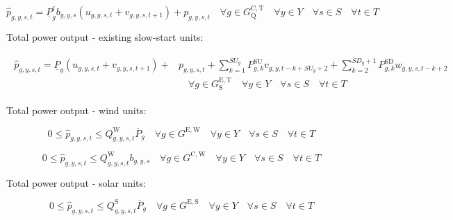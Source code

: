 \documentclass{article}
\newcommand{\sGeneratorsExistingWind}{G^{\mathrm{E,W}}}
\newcommand{\sGeneratorsExistingSolar}{G^{\mathrm{E,S}}}
\newcommand{\sGeneratorsCandidateWind}{G^{\mathrm{C,W}}}
\newcommand{\sYears}{Y}
\newcommand{\sScenarios}{S}
\newcommand{\sIntervals}{T}
\newcommand{\sGeneratorsCandidateThermalQuickStart}{G^{\mathrm{C,T}}_\mathrm{Q}}
\newcommand{\sGeneratorsExistingThermalSlowStart}{G^{\mathrm{E,T}}_\mathrm{S}}
\newcommand{\iGenerator}{g}
\newcommand{\iYear}{y}
\newcommand{\iScenario}{s}
\newcommand{\iInterval}{t}
\newcommand{\iIntervalAlias}{k}
\newcommand{\cPowerOutputMax}[1][\iGenerator,\iYear]{\overline{P}_{#1}}
\newcommand{\cPowerOutputMin}[1][\iGenerator]{\underline{P}_{#1}}
\newcommand{\cStartupDuration}[1][\iGenerator]{SU_{#1}}
\newcommand{\cStartupTrajectory}[1][\iGenerator,\iIntervalAlias]{P^{\mathrm{SU}}_{#1}}
\newcommand{\cShutdownDuration}[1][\iGenerator]{SD_{#1}}
\newcommand{\cShutdownTrajectory}[1][\iGenerator,\iIntervalAlias]{P^{\mathrm{SD}}_{#1}}
\newcommand{\cCapacityFactor}[1][\iGenerator,\iYear,\iScenario,\iInterval]{Q_{#1}}
\newcommand{\cPowerOutputMinProportion}{\cPowerOutputMin^{\mathrm{f}}}
\newcommand{\vStartupIndicator}[1][\iGenerator,\iYear,\iScenario,\iInterval]{v_{#1}}
\newcommand{\vShutdownIndicator}[1][\iGenerator,\iYear,\iScenario,\iInterval]{w_{#1}}
\newcommand{\vOnIndicator}[1][\iGenerator,\iYear,\iScenario,\iInterval]{u_{#1}}
\newcommand{\vPower}[1][\iGenerator,\iYear,\iScenario,\iInterval]{p_{#1}}
\newcommand{\vPowerTotal}[1][\iGenerator,\iYear,\iScenario,\iInterval]{\hat{p}_{#1}}
\newcommand{\vInstalledCapacityTotalScenario}[1][\iGenerator,\iYear,\iScenario]{b_{#1}}
\begin{document}
\begin{equation}
\vPowerTotal = \cPowerOutputMinProportion \vInstalledCapacityTotalScenario \left(\vOnIndicator + \vStartupIndicator[\iGenerator,\iYear,\iScenario,\iInterval+1]\right) + \vPower \quad \forall \iGenerator \in \sGeneratorsCandidateThermalQuickStart \quad \forall \iYear \in \sYears \quad \forall \iScenario \in \sScenarios \quad \forall \iInterval \in \sIntervals
\label{eqn: total power - quick start}
\end{equation}

Total power output - existing slow-start units:

\begin{align}
\begin{split}
\vPowerTotal =  \cPowerOutputMin \left(\vOnIndicator + \vStartupIndicator[\iGenerator,\iYear,\iScenario,\iInterval+1]\right) + & \vPower + \sum\limits_{\iIntervalAlias=1}^{\cStartupDuration} \cStartupTrajectory \vStartupIndicator[\iGenerator,\iYear,\iInterval-\iIntervalAlias+\cStartupDuration+2] + \sum\limits_{\iIntervalAlias=2}^{\cShutdownDuration + 1} \cShutdownTrajectory \vShutdownIndicator[\iGenerator,\iYear,\iScenario,\iInterval-\iIntervalAlias+2]\\
& \quad \forall \iGenerator \in \sGeneratorsExistingThermalSlowStart \quad \forall \iYear \in \sYears \quad \forall \iScenario \in \sScenarios \quad \forall \iInterval \in \sIntervals
\end{split}
\end{align}

Total power output - wind units:

\begin{equation}
0 \leq \vPowerTotal \leq \cCapacityFactor^{\mathrm{W}} \cPowerOutputMax[\iGenerator] \quad \forall \iGenerator \in \sGeneratorsExistingWind \quad \forall \iYear \in \sYears \quad \forall \iScenario \in \sScenarios \quad \forall \iInterval \in \sIntervals 
\end{equation}

\begin{equation}
0 \leq \vPowerTotal \leq \cCapacityFactor^{\mathrm{W}} \vInstalledCapacityTotalScenario \quad \forall \iGenerator \in \sGeneratorsCandidateWind \quad \forall \iYear \in \sYears \quad \forall \iScenario \in \sScenarios \quad \forall \iInterval \in \sIntervals
\end{equation}

Total power output - solar units:

\begin{equation}
0 \leq \vPowerTotal \leq \cCapacityFactor^{\mathrm{S}} \cPowerOutputMax[\iGenerator] \quad \forall \iGenerator \in \sGeneratorsExistingSolar \quad \forall \iYear \in \sYears \quad \forall \iScenario \in \sScenarios \quad \forall \iInterval \in \sIntervals 
\end{equation}
\end{document}
